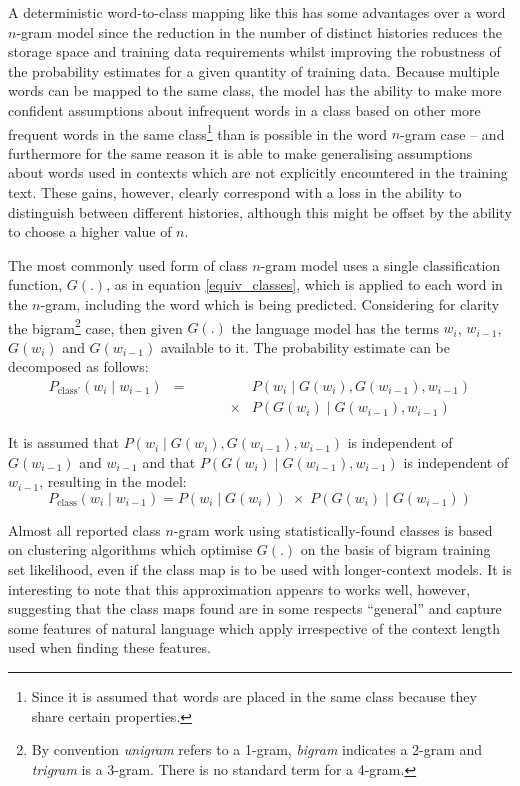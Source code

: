 A deterministic word-to-class mapping like this has some advantages
over a word $n$-gram model since the reduction in the number of
distinct histories reduces the storage space and training data
requirements whilst improving the robustness of the probability
estimates for a given quantity of training data. Because multiple
words can be mapped to the same class, the model has the ability to
make more confident assumptions about infrequent words in a class
based on other more frequent words in the same class\footnote{Since it
is assumed that words are placed in the same class because they share
certain properties.} than is possible in the word $n$-gram case -- and
furthermore for the same reason it is able to make generalising
assumptions about words used in contexts which are not explicitly
encountered in the training text. These gains, however, clearly
correspond with a loss in the ability to distinguish between different
histories, although this might be offset by the ability to
choose a higher value of $n$.

The most commonly used form of class $n$-gram model uses a single
classification function, $G(.)$, as in equation \ref{equiv_classes},
which is applied to each word in the $n$-gram, including the word which
is being predicted. Considering for clarity the bigram\footnote{By convention
{\it unigram} refers to a 1-gram,
{\it bigram} indicates a 2-gram and {\it trigram} is a 3-gram. There is no
standard term for a 4-gram.}
case, then given $G(.)$ the language model has the terms $w_i$,
$w_{i-1}$, $G(w_i)$ and $G(w_{i-1})$ available to it. The probability
estimate can be decomposed as follows:
\begin{eqnarray}
P_{\textrm{class'}}(w_i \;|\; w_{i-1})
& = & P(w_i \;|\; G(w_i), G(w_{i-1}), w_{i-1} )\nonumber\\
  & \qquad\qquad\times & P(G(w_i) \;|\; G(w_{i-1}), w_{i-1})
\label{chap2equalToOne}
\end{eqnarray}

It is assumed that $P(w_i
\;|\; G(w_i), G(w_{i-1}), w_{i-1})$ is independent of $G(w_{i-1})$ and
$w_{i-1}$ and that $P(G(w_i) \;|\; G(w_{i-1}), w_{i-1})$ is
independent of $w_{i-1}$, resulting in the model:
\begin{equation}
P_{\textrm{class}}(w_i \;|\; w_{i-1}) = P(w_i \;|\; G(w_{i})) \;\times\;
P(G(w_i) \;|\; G(w_{i-1}))
\label{normclass}
\end{equation} 

Almost all reported class $n$-gram work using statistically-found classes
is based on clustering algorithms which optimise $G(.)$ on the basis
of bigram training set likelihood, even if the class map is to be used
with longer-context models.  It is interesting to
note that this approximation appears to works well, however,
suggesting that the class maps found are in some respects ``general''
and capture some features of natural language which apply irrespective
of the context length used when finding these features.



